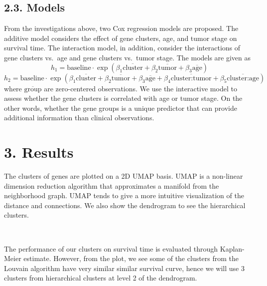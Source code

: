 \documentclass[11pt]{article}
\begin{document}
    \hypertarget{models}{%
\subsection{2.3. Models}\label{models}}

From the investigations above, two Cox regression models are proposed.
The additive model considers the effect of gene clusters, age, and tumor
stage on survival time. The interaction model, in addition, consider the
interactions of gene clusters vs.~age and gene clusters vs.~tumor stage.
The models are given as
\[h_1 = \text{baseline} \cdot \exp(\beta_1\overline{\text{cluster}} + \beta_2\overline{\text{tumor}} + \beta_3\overline{\text{age}})\]
\[h_2 = \text{baseline} \cdot \exp(\beta_1\overline{\text{cluster}} + \beta_2\overline{\text{tumor}} + \beta_3\overline{\text{age}} + \beta_4\overline{\text{cluster:tumor}} + \beta_5\overline{\text{cluster:age}})\]
where \(\overline{\text{group}}\) are zero-centered observations. We use
the interactive model to assess whether the gene clusters is correlated
with age or tumor stage. On the other words, whether the gene groups is
a unique predictor that can provide additional information than clinical
observations.

    \hypertarget{results}{%
\section{3. Results}\label{results}}

    The clusters of genes are plotted on a 2D UMAP\cite{lel2018umap} basis.
UMAP is a non-linear dimension reduction algorithm that approximates a
manifold from the neighborhood graph. UMAP tends to give a more
intuitive visualization of the distance and connections. We also show
the dendrogram to see the hierarchical clusters.


    \begin{center}
    \end{center}
    { \hspace*{\fill} \\}
    
    The performance of our clusters on survival time is evaluated through
Kaplan-Meier estimate. However, from the plot, we see some of the
clusters from the Louvain algorithm have very similar similar survival
curve, hence we will use 3 clusters from hierarchical clusters at level
2 of the dendrogram.
\end{document}
